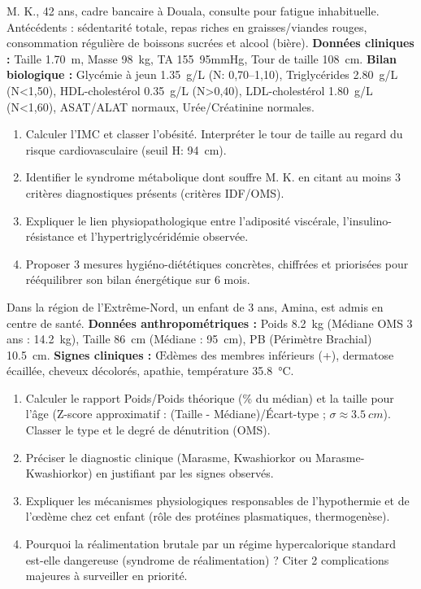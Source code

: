 \documentclass[11pt]{article}
\begin{document}
\begin{exercice}
M. K., 42 ans, cadre bancaire à Douala, consulte pour fatigue inhabituelle. Antécédents : sédentarité totale, repas riches en graisses/viandes rouges, consommation régulière de boissons sucrées et alcool (bière). 
\textbf{Données cliniques :} Taille \SI{1,70}{m}, Masse \SI{98}{kg}, TA \SI{155}{95}{mmHg}, Tour de taille \SI{108}{cm}. 
\textbf{Bilan biologique :} Glycémie à jeun \SI{1,35}{g/L} (N: 0,70--1,10), Triglycérides \SI{2,80}{g/L} (N<1,50), HDL-cholestérol \SI{0,35}{g/L} (N>0,40), LDL-cholestérol \SI{1,80}{g/L} (N<1,60), ASAT/ALAT normaux, Urée/Créatinine normales.
\begin{enumerate}
    \item Calculer l'IMC et classer l'obésité. Interpréter le tour de taille au regard du risque cardiovasculaire (seuil H: \SI{94}{cm}).
    \item Identifier le syndrome métabolique dont souffre M. K. en citant au moins 3 critères diagnostiques présents (critères IDF/OMS).
    \item Expliquer le lien physiopathologique entre l'adiposité viscérale, l'insulino-résistance et l'hypertriglycéridémie observée.
    \item Proposer 3 mesures hygiéno-diététiques concrètes, chiffrées et priorisées pour rééquilibrer son bilan énergétique sur 6 mois.
\end{enumerate}
\end{exercice}

\begin{exercice}
Dans la région de l'Extrême-Nord, un enfant de 3 ans, Amina, est admis en centre de santé. 
\textbf{Données anthropométriques :} Poids \SI{8,2}{kg} (Médiane OMS 3 ans : \SI{14,2}{kg}), Taille \SI{86}{cm} (Médiane : \SI{95}{cm}), PB (Périmètre Brachial) \SI{10,5}{cm}. 
\textbf{Signes cliniques :} Œdèmes des membres inférieurs (+), dermatose écaillée, cheveux décolorés, apathie, température \SI{35,8}{\celsius}.
\begin{enumerate}
    \item Calculer le rapport Poids/Poids théorique (\% du médian) et la taille pour l'âge (Z-score approximatif : (Taille - Médiane)/Écart-type ; $\sigma \approx \SI{3,5}{cm}$). Classer le type et le degré de dénutrition (OMS).
    \item Préciser le diagnostic clinique (Marasme, Kwashiorkor ou Marasme-Kwashiorkor) en justifiant par les signes observés.
    \item Expliquer les mécanismes physiologiques responsables de l'hypothermie et de l'œdème chez cet enfant (rôle des protéines plasmatiques, thermogenèse).
    \item Pourquoi la réalimentation brutale par un régime hypercalorique standard est-elle dangereuse (syndrome de réalimentation) ? Citer 2 complications majeures à surveiller en priorité.
\end{enumerate}
\end{exercice}
\end{document}
